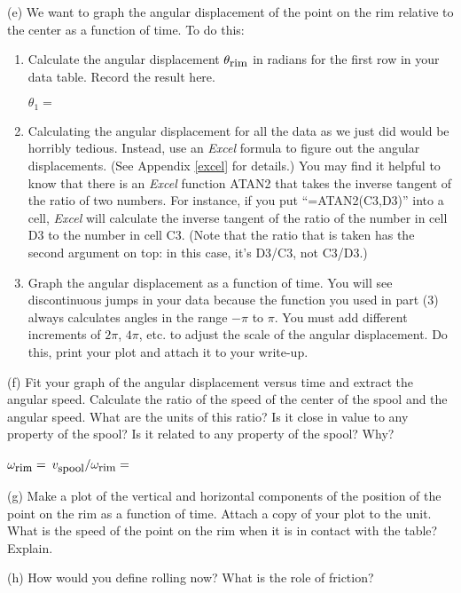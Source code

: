 (e) We want to graph the angular displacement of the point on the rim relative
to the center as a function of time. To do this:

\begin{enumerate}
\item Calculate the angular displacement \( \theta _{\mbox{\small rim}} \) in radians for the first
row in your data table. Record the result here.

$\theta _{1}=$

\item Calculating the angular displacement for all the data as we just did
would be horribly tedious. Instead, use an {\it Excel} formula to
figure out the angular displacements.  (See Appendix \ref{excel} for details.)
You may find it helpful to know that there is an {\it Excel} function
ATAN2 that takes the inverse tangent of the ratio of two numbers.
For instance, if you put ``=ATAN2(C3,D3)'' into a cell, {\it Excel}
will calculate the inverse tangent of the ratio of the number
in cell D3 to the number in cell C3.  (Note that the ratio
that is taken has the second argument on top: in this case, it's 
D3/C3, not C3/D3.)


\item Graph the angular displacement as a function of time.
You will see discontinuous jumps in your data because the function you used
in part (3) always calculates angles in the range \( -\pi  \) to \( \pi  \).
You must add different increments of \( 2\pi  \), \( 4\pi  \), etc. to adjust
the scale of the angular displacement. Do this, print your plot and attach it
to your write-up. 
\end{enumerate}
(f) Fit your graph of the angular displacement versus time and extract the angular
speed. Calculate the ratio of the speed of the center of the spool and the angular
speed. What are the units of this ratio? Is it close in value to any property
of the spool? Is it related to any property of the spool? Why?
\vspace{5mm}

\( \omega _{\mbox{\small rim}}= \)\hfill{} \( v_{\mbox{\small spool}}/
\omega _{\mbox{\small rim}}= \)\hfill{}
\vspace{10mm}

(g) Make a plot of the vertical and horizontal components of the position of
the point on the rim as a function of time. Attach a copy of your plot to the
unit. What is the speed of the point on the rim when it is in contact with the
table? Explain.
\vspace{20mm}

(h) How would you define rolling now? What is the role of friction?

